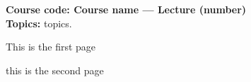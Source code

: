\documentclass[11pt]{article}
\def\vs{\vspace{5mm}}
\theoremstyle{pink}
\theoremstyle{boxedsolution}
\theoremstyle{definition}
\theoremstyle{claim}
\begin{document}
\thispagestyle{plain}

\begin{framed}
    \begin{center}
        \large{\textbf{Course code: Course name --- Lecture (number)}} \vspace{3mm}\\  \textbf{Topics:} topics.
    \end{center}
\end{framed}

\vs 

This is the first page

\newpage

this is the second page 
\end{document}
